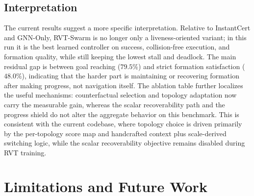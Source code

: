 \documentclass[journal]{IEEEtran}
\begin{document}
\subsection{Interpretation}
The current results suggest a more specific interpretation. Relative to
InstantCert and GNN-Only, RVT-Swarm is no longer only a
liveness-oriented variant; in this run it is the best learned
controller on success, collision-free execution, and formation quality,
while still keeping the lowest stall and deadlock. The main residual gap
is between goal reaching ($79.5\%$) and strict formation satisfaction
($48.0\%$), indicating that the harder part is maintaining or recovering
formation after making progress, not navigation itself. The ablation
table further localizes the useful mechanisms: counterfactual selection
and topology adaptation now carry the measurable gain, whereas the
scalar recoverability path and the progress shield do not alter the
aggregate behavior on this benchmark. This is consistent with the
current codebase, where topology choice is driven primarily by the
per-topology score map and handcrafted context plus scale-derived
switching logic, while
the scalar recoverability objective remains disabled during RVT
training.

\section{Limitations and Future Work}
\label{sec:limitations}
\end{document}
